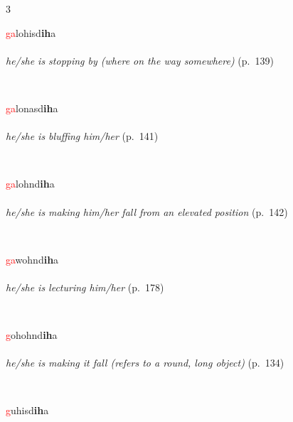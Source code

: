 \documentclass[oneside,openany]{book}%
\begin{document}
\begin{multicols}{3}
\begin{minipage}[t]{\linewidth}
\raggedright\noindent \textcolor{Red}{ga}lohisd\textbf{ih}a\\
\\
\noindent \textit{he/she is stopping by (where on the way somewhere)} (p.~139)
\end{minipage}\\[1em]%
\begin{minipage}[t]{\linewidth}
\raggedright\noindent \textcolor{Red}{ga}lonasd\textbf{ih}a\\
\\
\noindent \textit{he/she is bluffing him/her} (p.~141)
\end{minipage}\\[1em]%
\begin{minipage}[t]{\linewidth}
\raggedright\noindent \textcolor{Red}{ga}lohnd\textbf{ih}a\\
\\
\noindent \textit{he/she is making him/her fall from an elevated position} (p.~142)
\end{minipage}\\[1em]%
\begin{minipage}[t]{\linewidth}
\raggedright\noindent \textcolor{Red}{ga}wohnd\textbf{ih}a\\
\\
\noindent \textit{he/she is lecturing him/her} (p.~178)
\end{minipage}\\[1em]%
\begin{minipage}[t]{\linewidth}
\raggedright\noindent \textcolor{Red}{g}ohohnd\textbf{ih}a\\
\\
\noindent \textit{he/she is making it fall (refers to a round, long object)} (p.~134)
\end{minipage}\\[1em]%
\begin{minipage}[t]{\linewidth}
\raggedright\noindent \textcolor{Red}{g}uhisd\textbf{ih}a\\
\\

\end{minipage}
\end{multicols}
\end{document}

